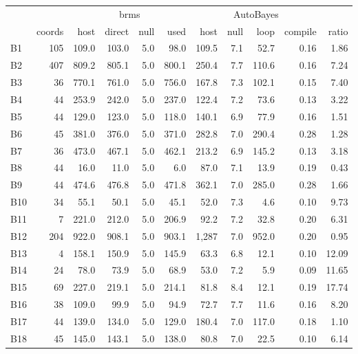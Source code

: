 \documentclass[11pt]{article}
\begin{document}
\begin{table}[H]
\footnotesize
\setlength{\tabcolsep}{4pt}
\begin{center}
\begin{tabular}{@{}lrrrrrrrrrr@{}}
\toprule
& & \multicolumn{4}{c}{brms} & \multicolumn{4}{c}{AutoBayes} & \\
\cmidrule(lr){3-6}\cmidrule(lr){7-10}& coords & host & direct & null & used & host & null & loop & compile & ratio \\
\midrule
B1 & 105 & 109.0 & 103.0 & 5.0 & 98.0 & 109.5 & 7.1 & 52.7 & 0.16 & 1.86 \\
B2 & 407 & 809.2 & 805.1 & 5.0 & 800.1 & 250.4 & 7.7 & 110.6 & 0.16 & 7.24 \\
B3 & 36 & 770.1 & 761.0 & 5.0 & 756.0 & 167.8 & 7.3 & 102.1 & 0.15 & 7.40 \\
B4 & 44 & 253.9 & 242.0 & 5.0 & 237.0 & 122.4 & 7.2 & 73.6 & 0.13 & 3.22 \\
B5 & 44 & 129.0 & 123.0 & 5.0 & 118.0 & 140.1 & 6.9 & 77.9 & 0.16 & 1.51 \\
B6 & 45 & 381.0 & 376.0 & 5.0 & 371.0 & 282.8 & 7.0 & 290.4 & 0.28 & 1.28 \\
B7 & 36 & 473.0 & 467.1 & 5.0 & 462.1 & 213.2 & 6.9 & 145.2 & 0.13 & 3.18 \\
B8 & 44 & 16.0 & 11.0 & 5.0 & 6.0 & 87.0 & 7.1 & 13.9 & 0.19 & 0.43 \\
B9 & 44 & 474.6 & 476.8 & 5.0 & 471.8 & 362.1 & 7.0 & 285.0 & 0.28 & 1.66 \\
B10 & 34 & 55.1 & 50.1 & 5.0 & 45.1 & 52.0 & 7.3 & 4.6 & 0.10 & 9.73 \\
B11 & 7 & 221.0 & 212.0 & 5.0 & 206.9 & 92.2 & 7.2 & 32.8 & 0.20 & 6.31 \\
B12 & 204 & 922.0 & 908.1 & 5.0 & 903.1 & 1,287 & 7.0 & 952.0 & 0.20 & 0.95 \\
B13 & 4 & 158.1 & 150.9 & 5.0 & 145.9 & 63.3 & 6.8 & 12.1 & 0.10 & 12.09 \\
B14 & 24 & 78.0 & 73.9 & 5.0 & 68.9 & 53.0 & 7.2 & 5.9 & 0.09 & 11.65 \\
B15 & 69 & 227.0 & 219.1 & 5.0 & 214.1 & 81.8 & 8.4 & 12.1 & 0.19 & 17.74 \\
B16 & 38 & 109.0 & 99.9 & 5.0 & 94.9 & 72.7 & 7.7 & 11.6 & 0.16 & 8.20 \\
B17 & 44 & 139.0 & 134.0 & 5.0 & 129.0 & 180.4 & 7.0 & 117.0 & 0.18 & 1.10 \\
B18 & 45 & 145.0 & 143.1 & 5.0 & 138.0 & 80.8 & 7.0 & 22.5 & 0.10 & 6.14 \\
\bottomrule

\end{tabular}
\end{center}
\end{table}
\end{document}
